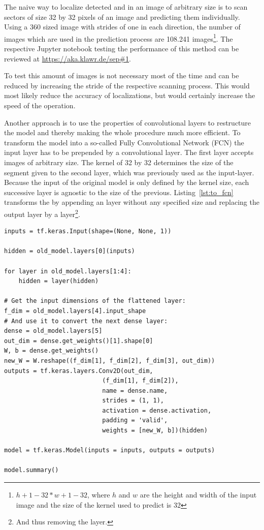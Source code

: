 The naive way to localize detected  and  in an image of arbitrary size is to scan sectors of size 32 by 32 pixels of an image and predicting them individually.
Using a 360 sized image with strides of one in each direction, the number of images which are used in the prediction process are 108.241 images\footnote{\(h + 1 - 32 * w + 1 - 32\), where \(h\) and \(w\) are the height and width of the input image and the size of the kernel used to predict is 32}.
The respective Jupyter notebook testing the performance of this method can be reviewed at \url{https://aka.klawr.de/sep#1}. %

To test this amount of images is not necessary most of the time and can be reduced by increasing the stride of the respective scanning process.
This would most likely reduce the accuracy of localizations, but would certainly increase the speed of the operation.

Another approach is to use the properties of convolutional layers to restructure the model and thereby making the whole procedure much more efficient.
To transform the model into a so-called Fully Convolutional Network (FCN) the input layer has to be prepended by a convolutional layer.
The first layer accepts images of arbitrary size.
The kernel of 32 by 32 determines the size of the segment given to the second layer, which was previously used as the input-layer.
Because the input of the original model is only defined by the kernel size, each successive layer is agnostic to the size of the previous.
Listing~\ref{lst:to_fcn} transforms the  by appending an  layer without any specified size and replacing the output layer by a  layer\footnote{And thus removing the  layer.}.

\begin{lstlisting}[caption={Transformation of the Symbol Classifier into a FCN.}, label=lst:to_fcn]
inputs = tf.keras.Input(shape=(None, None, 1))

hidden = old_model.layers[0](inputs)

for layer in old_model.layers[1:4]:
    hidden = layer(hidden)

# Get the input dimensions of the flattened layer:
f_dim = old_model.layers[4].input_shape
# And use it to convert the next dense layer:
dense = old_model.layers[5]
out_dim = dense.get_weights()[1].shape[0]
W, b = dense.get_weights()
new_W = W.reshape((f_dim[1], f_dim[2], f_dim[3], out_dim))
outputs = tf.keras.layers.Conv2D(out_dim,
                           (f_dim[1], f_dim[2]),
                           name = dense.name,
                           strides = (1, 1),
                           activation = dense.activation,
                           padding = 'valid',
                           weights = [new_W, b])(hidden)

model = tf.keras.Model(inputs = inputs, outputs = outputs)

model.summary()
\end{lstlisting}

